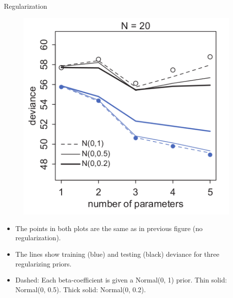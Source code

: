 \documentclass[handout]{beamer}
\begin{document}
\begin{frame}{Regularization}
\scriptsize{

\begin{figure}[h!]
	\centering
	\includegraphics[scale=0.4]{pics/regularization.png}
\end{figure}

\begin{itemize}

\item The points in both plots are the same as in previous figure (no regularization).

\item The lines show training (blue) and testing (black) deviance for three regularizing priors.

\item Dashed: Each beta-coefficient is given a Normal(0, 1) prior. Thin solid: Normal(0, 0.5). Thick solid: Normal(0, 0.2).

\end{itemize}


} 
\end{frame}
\end{document}
